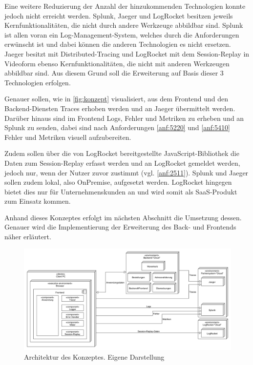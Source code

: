 Eine weitere Reduzierung der Anzahl der hinzukommenden Technologien konnte jedoch nicht erreicht werden. Splunk, Jaeger und LogRocket besitzen jeweils Kernfunktionalitäten, die nicht durch andere Werkzeuge abbildbar sind. Splunk ist allen voran ein Log-Management-System, welches durch die Anforderungen erwünscht ist und dabei können die anderen Technologien es nicht ersetzen. Jaeger besitzt mit Distributed-Tracing und LogRocket mit dem Session-Replay in Videoform ebenso Kernfunktionalitäten, die nicht mit anderen Werkzeugen abbildbar sind. Aus diesem Grund soll die Erweiterung auf Basis dieser 3 Technologien erfolgen.

Genauer sollen, wie in \autoref{fig:konzept} visualisiert, aus dem Frontend und den Backend-Diensten Traces erhoben werden und an Jaeger übermittelt werden. Darüber hinaus sind im Frontend Logs, Fehler und Metriken zu erheben und an Splunk zu senden, dabei sind nach Anforderungen \ref*{anf:5220} und \ref*{anf:5410} Fehler und Metriken visuell aufzubereiten.

Zudem sollen über die von LogRocket bereitgestellte JavaScript-Bibliothek die Daten zum Session-Replay erfasst werden und an LogRocket gemeldet werden, jedoch nur, wenn der Nutzer zuvor zustimmt (vgl. \autoref{anf:2511}). Splunk und Jaeger sollen zudem lokal, also OnPremise, aufgesetzt werden. LogRocket hingegen bietet dies nur für Unternehmenskunden an und wird somit als SaaS-Produkt zum Einsatz kommen.

Anhand dieses Konzeptes erfolgt im nächsten Abschnitt die Umsetzung dessen. Genauer wird die Implementierung der Erweiterung des Back- und Frontends näher erläutert.

\begin{figure}[H]
	\centering
	\includegraphics[width=\linewidth]{img/04_erstellung-poc/konzept.png}
	\caption{Architektur des Konzeptes. Eigene Darstellung}
	\label{fig:konzept}
\end{figure}

\vspace{-1\baselineskip}
